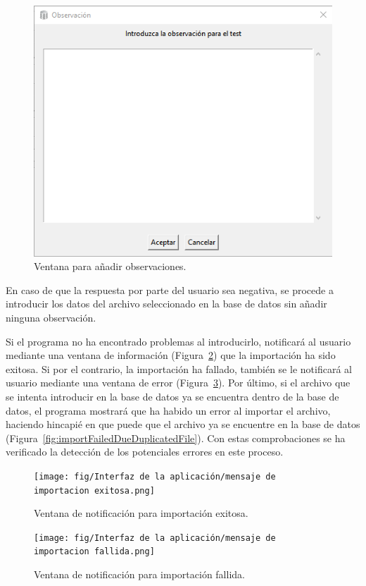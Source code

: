 \begin{figure}[H]
    \centering
    \includegraphics[width=0.6\linewidth]{fig/Interfaz de la aplicación/ventana para añadir observaciones.png}
    \caption{Ventana para añadir observaciones.}
    \label{fig:observationsWindow}
\end{figure}

En caso de que la respuesta por parte del usuario sea negativa, se procede a introducir los datos del archivo seleccionado en la base de datos sin añadir ninguna observación.

Si el programa no ha encontrado problemas al introducirlo, notificará al usuario mediante una ventana de información (Figura~\ref{fig:importSuccess}) que la importación ha sido exitosa. Si por el contrario, la importación ha fallado, también se le notificará al usuario mediante una ventana de error (Figura~\ref{fig:importFailed}). Por último, si el archivo que se intenta introducir en la base de datos ya se encuentra dentro de la base de datos, el programa mostrará que ha habido un error al importar el archivo, haciendo hincapié en que puede que el archivo ya se encuentre en la base de datos (Figura~\ref{fig:importFailedDueDuplicatedFile}). Con estas comprobaciones se ha verificado la detección de los potenciales errores en este proceso.

\begin{figure}[H]
    \centering
    \texttt{[image: fig/Interfaz de la aplicación/mensaje de importacion exitosa.png]}
    \caption{Ventana de notificación para importación exitosa.}
    \label{fig:importSuccess}
\end{figure}

\begin{figure}[H]
    \centering
    \texttt{[image: fig/Interfaz de la aplicación/mensaje de importacion fallida.png]}
    \caption{Ventana de notificación para importación fallida.}
    \label{fig:importFailed}
\end{figure}

